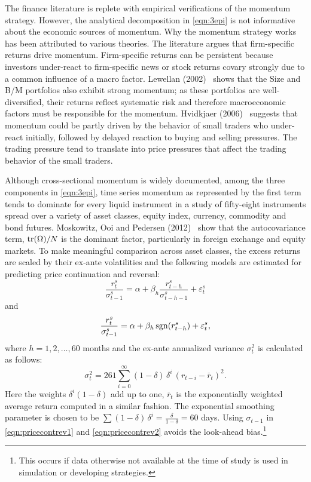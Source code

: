 The finance literature is replete with empirical verifications of the momentum strategy. However, the analytical decomposition in \eqref{eqn:3epi} is not informative about the economic sources of momentum. Why the momentum strategy works has been attributed to various theories. The literature argues that firm-specific returns drive momentum. Firm-specific returns can be persistent because investors under-react to firm-specific news or stock returns covary strongly due to a common influence of a macro factor. Lewellan (2002)~\cite{lew2002} shows that the Size and B/M portfolios also exhibit strong momentum; as these portfolios are well-diversified, their returns reflect systematic risk and therefore macroeconomic factors must be responsible for the momentum. Hvidkjaer (2006)~\cite{hvid2006} suggests that momentum could be partly driven by the behavior of small traders who under-react initially, followed by delayed reaction to buying and selling pressures. The trading pressure tend to translate into price pressures that affect the trading behavior of the small traders.


Although cross-sectional momentum is widely documented, among the three components in \eqref{eqn:3epi}, time series momentum as represented by the first term tends to dominate for every liquid instrument in a study of fifty-eight instruments spread over a variety of asset classes, equity index, currency, commodity and bond futures. Moskowitz, Ooi and Pedersen (2012)~\cite{mos2012} show that the autocovariance term, $\operatorname{tr}(\Omega)/N$ is the dominant factor, particularly in foreign exchange and equity markets. To make meaningful comparison across asset classes, the excess returns are scaled by their ex-ante volatilities and the following models are estimated for predicting price continuation and reversal:
	\begin{equation} \label{eqn:pricecontrev1}
	\frac{r_t^s}{\sigma_{t-1}^s} = \alpha + \beta_h \dfrac{r_{t-h}^s}{\sigma_{t-h-1}^s} + \varepsilon_t^s
	\end{equation}
and
	\begin{equation} \label{eqn:pricecontrev2}
	\frac{r_t^s}{\sigma_{t-1}^s} = \alpha + \beta_h \sgn(r_{t-h}^s) + \varepsilon_t^s,
	\end{equation}
where $h= 1,2, \ldots, 60$ months and the ex-ante annualized variance $\sigma_t^2$ is calculated as follows:
	\begin{equation} \label{eqn:pricecontrev3}
	\sigma_t^2 = 261 \sum_{i=0}^\infty (1 - \delta)\,\delta^i \,(r_{t-i} - \overline{r}_t)^2.
	\end{equation}
Here the weights $\delta^i (1 - \delta)$ add up to one, $\overline{r}_t$ is the exponentially weighted average return computed in a similar fashion. The exponential smoothing parameter is chosen to be $\sum(1 - \delta)\, \delta^i = \frac{\delta}{1 - \delta} = 60$ days. Using $\sigma_{t-1}$ in \eqref{eqn:pricecontrev1} and \eqref{eqn:pricecontrev2} avoids the look-ahead bias.\footnote{This occurs if data otherwise not available at the time of study is used in simulation or developing strategies.}


